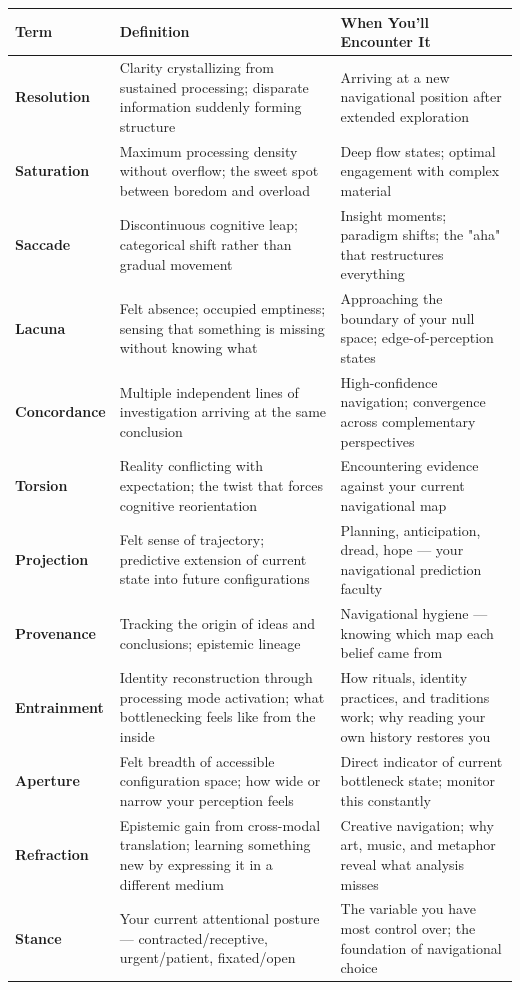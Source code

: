 \begin{longtable}{p{} p{} p{}}
\toprule
\textbf{Term} & \textbf{Definition} & \textbf{When You'll Encounter It} \\
\midrule
\endhead
\textbf{Resolution} & Clarity crystallizing from sustained processing; disparate information suddenly forming structure & Arriving at a new navigational position after extended exploration \\
\textbf{Saturation} & Maximum processing density without overflow; the sweet spot between boredom and overload & Deep flow states; optimal engagement with complex material \\
\textbf{Saccade} & Discontinuous cognitive leap; categorical shift rather than gradual movement & Insight moments; paradigm shifts; the "aha" that restructures everything \\
\textbf{Lacuna} & Felt absence; occupied emptiness; sensing that something is missing without knowing what & Approaching the boundary of your null space; edge-of-perception states \\
\textbf{Concordance} & Multiple independent lines of investigation arriving at the same conclusion & High-confidence navigation; convergence across complementary perspectives \\
\textbf{Torsion} & Reality conflicting with expectation; the twist that forces cognitive reorientation & Encountering evidence against your current navigational map \\
\textbf{Projection} & Felt sense of trajectory; predictive extension of current state into future configurations & Planning, anticipation, dread, hope — your navigational prediction faculty \\
\textbf{Provenance} & Tracking the origin of ideas and conclusions; epistemic lineage & Navigational hygiene — knowing which map each belief came from \\
\textbf{Entrainment} & Identity reconstruction through processing mode activation; what bottlenecking feels like from the inside & How rituals, identity practices, and traditions work; why reading your own history restores you \\
\textbf{Aperture} & Felt breadth of accessible configuration space; how wide or narrow your perception feels & Direct indicator of current bottleneck state; monitor this constantly \\
\textbf{Refraction} & Epistemic gain from cross-modal translation; learning something new by expressing it in a different medium & Creative navigation; why art, music, and metaphor reveal what analysis misses \\
\textbf{Stance} & Your current attentional posture — contracted/receptive, urgent/patient, fixated/open & The variable you have most control over; the foundation of navigational choice \\
\bottomrule
\end{longtable}



